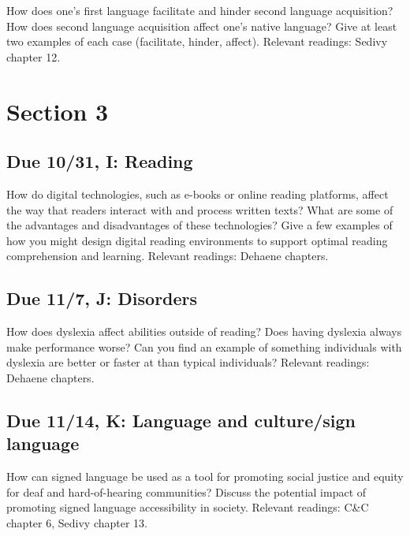 \documentclass[
  letterpaper,
  DIV=11,
  numbers=noendperiod]{scrreprt}
\begin{document}
How does one's first language facilitate and hinder second language
acquisition? How does second language acquisition affect one's native
language? Give at least two examples of each case (facilitate, hinder,
affect). Relevant readings: Sedivy chapter 12.

\hypertarget{section-3}{%
\section*{Section 3}\label{section-3}}


\hypertarget{due-1031-i-reading}{%
\subsection*{Due 10/31, I: Reading}\label{due-1031-i-reading}}

How do digital technologies, such as e-books or online reading
platforms, affect the way that readers interact with and process written
texts? What are some of the advantages and disadvantages of these
technologies? Give a few examples of how you might design digital
reading environments to support optimal reading comprehension and
learning. Relevant readings: Dehaene chapters.

\hypertarget{due-117-j-disorders}{%
\subsection*{Due 11/7, J: Disorders}\label{due-117-j-disorders}}

How does dyslexia affect abilities outside of reading? Does having
dyslexia always make performance worse? Can you find an example of
something individuals with dyslexia are better or faster at than typical
individuals? Relevant readings: Dehaene chapters.

\hypertarget{due-1114-k-language-and-culturesign-language}{%
\subsection*{Due 11/14, K: Language and culture/sign
language}\label{due-1114-k-language-and-culturesign-language}}

How can signed language be used as a tool for promoting social justice
and equity for deaf and hard-of-hearing communities? Discuss the
potential impact of promoting signed language accessibility in society.
Relevant readings: C\&C chapter 6, Sedivy chapter 13.
\end{document}
